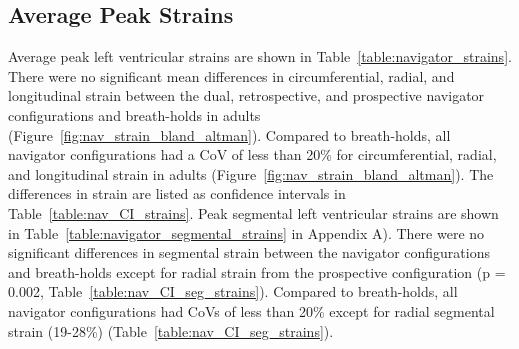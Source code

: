 \subsection{Average Peak Strains}
	Average peak left ventricular strains are shown in Table~\ref{table:navigator_strains}. There were no significant mean differences in circumferential, radial, and longitudinal strain between the dual, retrospective, and prospective navigator configurations and breath-holds in adults (Figure~\ref{fig:nav_strain_bland_altman}). Compared to breath-holds, all navigator configurations had a CoV of less than 20\% for circumferential, radial, and longitudinal strain in adults (Figure~\ref{fig:nav_strain_bland_altman}). The differences in strain are listed as confidence intervals in Table~\ref{table:nav_CI_strains}. Peak segmental left ventricular strains are shown in Table~\ref{table:navigator_segmental_strains} in Appendix A). There were no significant differences in segmental strain between the navigator configurations and breath-holds except for radial strain from the prospective configuration (p = 0.002, Table~\ref{table:nav_CI_seg_strains}). Compared to breath-holds, all navigator configurations had CoVs of less than 20\% except for radial segmental strain (19-28\%) (Table~\ref{table:nav_CI_seg_strains}).

